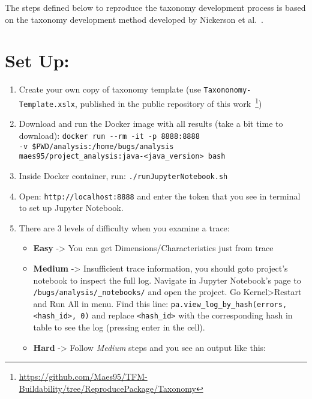 The steps defined below to reproduce the taxonomy development process is based on the taxonomy development method developed by Nickerson et al.~\cite{Nickerson2013}.

\section{Set Up:}

\begin{enumerate}
	\item
	Create your own copy of taxonomy template (use
	\texttt{Taxononomy-Template.xslx}, published in the public repository of this work~\footnote{\url{https://github.com/Maes95/TFM-Buildability/tree/ReproducePackage/Taxonomy}})
	\item
	Download and run the Docker image with all results (take a bit time to
	download):
	\texttt{docker\ run\ -\/-rm\ -it\ -p\ 8888:8888}\\
		\hspace*{1cm} \texttt{-v\ \$PWD/analysis:/home/bugs/analysis}\\
		\hspace*{1cm} \texttt{maes95/project\_analysis:java-\textless{}java\_version\textgreater{}\ bash}
	\item
	Inside Docker container, run: \texttt{./runJupyterNotebook.sh}
	\item
	Open: \texttt{http://localhost:8888} and enter the token that you see
	in terminal to set up Jupyter Notebook.
	\item
	There are 3 levels of difficulty when you examine a trace:
	
	\begin{itemize}
		\item
		\textbf{Easy} -\textgreater{} You can get Dimensions/Characteristics
		just from trace
		\item
		\textbf{Medium} -\textgreater{} Insufficient trace information, you
		should goto project's notebook to inspect the full log. Navigate in
		Jupyter Notebook's page to \texttt{/bugs/analysis/\_notebooks/} and
		open the project. Go Kernel\textgreater Restart and Run All in menu.
		Find this line:
		\texttt{pa.view\_log\_by\_hash(errors,\textless{}hash\_id\textgreater{},\ 0)}
		and replace \texttt{\textless{}hash\_id\textgreater{}} with the
		corresponding hash in table to see the log (pressing enter in the
		cell).
		\item
		\textbf{Hard} -\textgreater{} Follow \emph{Medium} steps and you see
		an output like this:
		

\end{itemize}
\end{enumerate}
